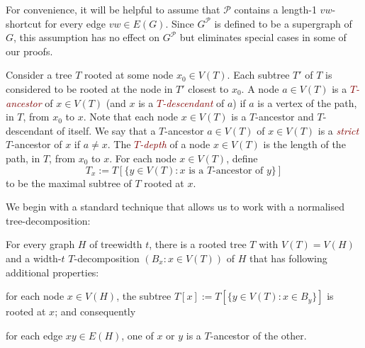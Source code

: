 \documentclass{patmorin}
\newcommand{\defin}[1]{\textcolor{Maroon}{\emph{#1}}}
\newcommand{\tlabel}[1]{\label{t:#1}}
\newcommand{\PP}{\mathcal{P}}
\renewcommand{\le}{\leqslant}
\begin{document}
For convenience, it will be helpful to assume that $\mathcal{P}$ contains a length-1 $vw$-shortcut for every edge $vw\in E(G)$.  Since $G^\PP$ is defined to be a supergraph of $G$, this assumption has no effect on $G^{\mathcal{P}}$ but eliminates special cases in some of our proofs.

Consider a tree $T$ rooted at some node $x_0\in V(T)$. Each subtree $T'$ of $T$ is considered to be rooted at the node in $T'$ closest to $x_0$. A node $a\in V(T)$ is a \defin{$T$-ancestor} of $x\in V(T)$ (and $x$ is a \defin{$T$-descendant} of $a$) if $a$ is a vertex of the path, in $T$, from $x_0$ to $x$.  Note that each node $x\in V(T)$ is a $T$-ancestor and $T$-descendant of itself.  We say that a $T$-ancestor $a\in V(T)$ of $x\in V(T)$ is a \defin{strict} $T$-ancestor of $x$ if $a\neq x$.
The \defin{$T$-depth} of a node $x\in V(T)$ is the length of the path, in $T$, from $x_0$ to $x$.  For each node $x\in V(T)$, define
\[T_x := T[\{y\in V(T):\mbox{$x$ is a $T$-ancestor of $y$}\}] \]
to be the maximal subtree of $T$ rooted at $x$.

We begin with a standard technique that allows us to work with a normalised tree-decomposition:

\begin{lem}
  For every graph $H$ of treewidth $t$, there is a rooted tree $T$ with $V(T)=V(H)$ and a width-$t$ $T$-decomposition $(B_x:x\in V(T))$ of $H$ that has following additional properties:
  \begin{compactenum}[(T1)]
    \item\tlabel{subtree-root} for each node $x\in V(H)$, the subtree $T[x]:=T[\{y\in V(T):x\in B_y\}]$ is rooted at $x$; and consequently
    \item\tlabel{ancestor-edge}\tlabel{last} for each edge $xy\in E(H)$, one of $x$ or $y$ is a $T$-ancestor of the other.
  \end{compactenum}
\end{lem}
\end{document}
